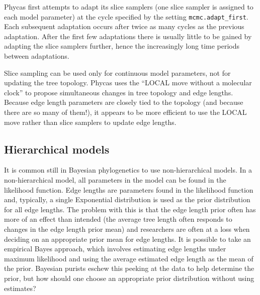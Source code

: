 \documentclass[10pt]{article}
\newcommand{\opt}[1]{{\tt \small #1}\index{#1}}		%
\begin{document}
Phycas first attempts to adapt its slice samplers (one slice sampler is assigned to each model parameter) at the cycle specified by the setting \opt{mcmc.adapt\_first}. Each subsequent adaptation occurs after twice as many cycles as the previous adaptation. After the first few adaptations there is usually little to be gained by adapting the slice samplers further, hence the increasingly long time periods between adaptations. 

Slice sampling can be used only for continuous model parameters, not for updating the tree topology. Phycas uses the \citet{LargetSimon1999} ``LOCAL move without a molecular clock'' to propose simultaneous changes in tree topology and edge lengths. Because edge length parameters are closely tied to the topology (and because there are so many of them!), it appears to be more efficient to use the LOCAL move rather than slice samplers to update edge lengths.

\subsection{Hierarchical models} \label{hierarchicalmodels}
It is common still in Bayesian phylogenetics to use non-hierarchical models. In a non-hierarchical model, all parameters in the model can be found in the likelihood function. Edge lengths are parameters found in the likelihood function and, typically, a single Exponential distribution is used as the prior distribution for all edge lengths. The problem with this is that the edge length prior often has more of an effect than intended (the average tree length often responds to changes in the edge length prior mean) and researchers are often at a loss when deciding on an appropriate prior mean for edge lengths. It is possible to take an empirical Bayes approach, which involves estimating edge lengths under maximum likelihood and using the average estimated edge length as the mean of the prior. Bayesian purists eschew this peeking at the data to help determine the prior, but how should one choose an appropriate prior distribution without using estimates? 
\end{document}
